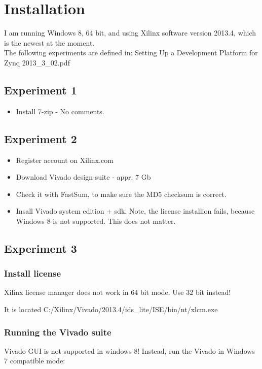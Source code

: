 \documentclass[]{report}
\begin{document}
\chapter{Installation}
I am running Windows 8, 64 bit, and using Xilinx software version 2013.4, which is the newest at the moment.\\
The following experiments are defined in: Setting Up a Development Platform for Zynq 2013\_3\_02.pdf

\section{Experiment 1}
\begin{itemize}
	\item Install 7-zip - No comments.
\end{itemize}

\section{Experiment 2}
\begin{itemize}
	\item Register account on Xilinx.com
	\item Download Vivado design suite - appr. 7 Gb
	\item Check it with FastSum, to make sure the MD5 checksum is correct.
	\item Insall Vivado system edition + sdk. Note, the license installion fails, because Windows 8 is not supported. This does not matter.
\end{itemize}

\section{Experiment 3}
\subsection{Install license}
Xilinx license manager does not work in 64 bit mode. Use 32 bit instead!

It is located C:/Xilinx/Vivado/2013.4/ids\_lite/ISE/bin/nt/xlcm.exe

\subsection{Running the Vivado suite}
Vivado GUI is not supported in windows 8! Instead, run the Vivado in Windows 7 compatible mode:
\end{document}

